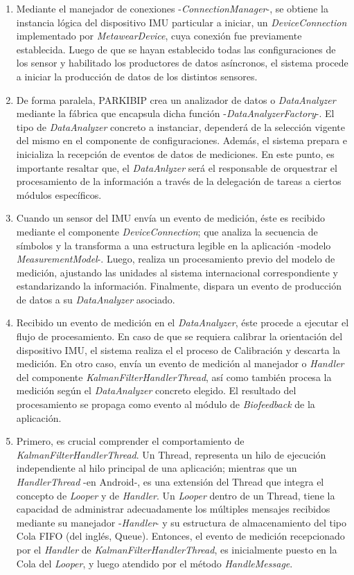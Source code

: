 \begin{enumerate}
    \item Mediante el manejador de conexiones -\textit{ConnectionManager}-, se obtiene la instancia lógica del dispositivo IMU particular a iniciar, un \textit{DeviceConnection} implementado por \textit{MetawearDevice}, cuya conexión fue previamente establecida. Luego de que se hayan establecido todas las configuraciones de los sensor y habilitado los productores de datos asíncronos, el sistema procede a iniciar la producción de datos de los distintos sensores. 
    \item De forma paralela, PARKIBIP crea un analizador de datos o \textit{DataAnalyzer} mediante la fábrica que encapsula dicha función -\textit{DataAnalyzerFactory}-. El tipo de \textit{DataAnalyzer} concreto a instanciar, dependerá de la selección vigente del mismo en el componente de configuraciones. Además, el sistema prepara e inicializa la recepción de eventos de datos de mediciones. En este punto, es importante resaltar que, el \textit{DataAnlyzer} será el responsable de orquestrar el procesamiento de la información a través de la delegación de tareas a ciertos módulos específicos.
    \item Cuando un sensor del IMU envía un evento de medición, éste es recibido mediante el componente \textit{DeviceConnection}; que analiza la secuencia de símbolos y la transforma a una estructura legible en la aplicación -modelo \textit{MeasurementModel}-. Luego, realiza un procesamiento previo del modelo de medición, ajustando las unidades al sistema internacional correspondiente y estandarizando la información.  Finalmente, dispara un evento de producción de datos a su \textit{DataAnalyzer} asociado.
    \item Recibido un evento de medición en el \textit{DataAnalyzer}, éste procede a ejecutar el flujo de procesamiento. En caso de que se requiera  calibrar la orientación del dispositivo IMU, el sistema realiza el el proceso de Calibración y descarta la medición. En otro caso, envía un evento de medición al manejador o \textit{Handler} del componente \textit{KalmanFilterHandlerThread}, así como también procesa la medición según el \textit{DataAnalyzer} concreto elegido. El resultado del procesamiento se propaga como evento al módulo de \textit{Biofeedback} de la aplicación.
    \item Primero, es crucial comprender el comportamiento de \textit{KalmanFilterHandlerThread}. Un Thread, representa un hilo de ejecución independiente al hilo principal de una aplicación; mientras que un \textit{HandlerThread} -en Android-, es una extensión del Thread que integra el concepto de \textit{Looper} y de \textit{Handler}. Un \textit{Looper} dentro de un Thread, tiene la capacidad de administrar adecuadamente los múltiples mensajes recibidos mediante su manejador -\textit{Handler}- y su estructura de almacenamiento del tipo Cola FIFO (del inglés, Queue). Entonces, el evento de medición recepcionado por el \textit{Handler} de \textit{KalmanFilterHandlerThread}, es inicialmente puesto en la Cola del \textit{Looper}, y luego atendido por el método \textit{HandleMessage}.

\end{enumerate}

